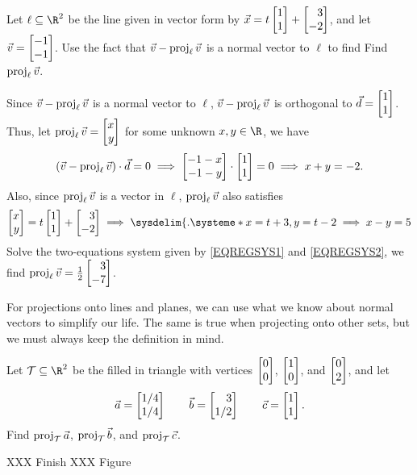 \begin{example}
	Let $\ell\subseteq \R^2$ be the line given in vector form by $\vec x=t\mat{1\\1}+\mat{3\\-2}$,
	and let $\vec v=\mat{-1\\-1}$. Use the fact that $\vec v-\operatorname{proj}_\ell\vec v$ is a normal vector to $\ell$
	to find Find $\operatorname{proj}_\ell \vec v$.

	Since $\vec v-\operatorname{proj}_\ell\vec v$ is a normal vector to $\ell$, $\vec v-\operatorname{proj}_\ell\vec v$ is orthogonal to $\vec d=\mat{1\\1}$. Thus, let $\Proj_\ell\vec v = \mat{x\\y}$ for some unknown $x,y\in\R$, we have
	\begin{equation}
	\label{EQREGSYS1}
	    (\vec v-\Proj_\ell\vec v)\cdot\vec d=0 \implies \mat{-1-x\\-1-y}\cdot \mat{1\\1}=0\implies x+y=-2.
	\end{equation}
	Also, since $\operatorname{proj}_\ell\vec v$ is a vector in $\ell$, $\operatorname{proj}_\ell\vec v$ also satisfies
	\begin{equation}
	\label{EQREGSYS2}
	    \mat{x\\y}=t\mat{1\\1}+\mat{3\\-2}\implies
	    \sysdelim\{.
		\systeme*{
			x=t+3,
			y=t-2
		} \implies x-y=5
	\end{equation}
	Solve the two-equations system given by \eqref{EQREGSYS1} and \eqref{EQREGSYS2}, we find $\Proj_\ell\vec v = \frac{1}{2}\mat{3\\-7}$. 
\end{example}

For projections onto lines and planes, we can use what we know about normal vectors to simplify our life.
The same is true when projecting onto other sets, but we must always keep the definition in mind.

\begin{example}
	Let $\mathcal T\subseteq \R^2$ be the filled in triangle with vertices $\mat{0\\0}$, 
	$\mat{1\\0}$, and $\mat{0\\2}$, and let
	\[
		\vec a=\mat{1/4\\1/4}\qquad \vec b=\mat{3\\1/2}\qquad \vec c=\mat{1\\1}.
	\]
	Find $\operatorname{proj}_{\mathcal T}\vec a$, $\operatorname{proj}_{\mathcal T}\vec b$, and  $\operatorname{proj}_{\mathcal T}\vec c$.

	XXX Finish
	XXX Figure
\end{example}

